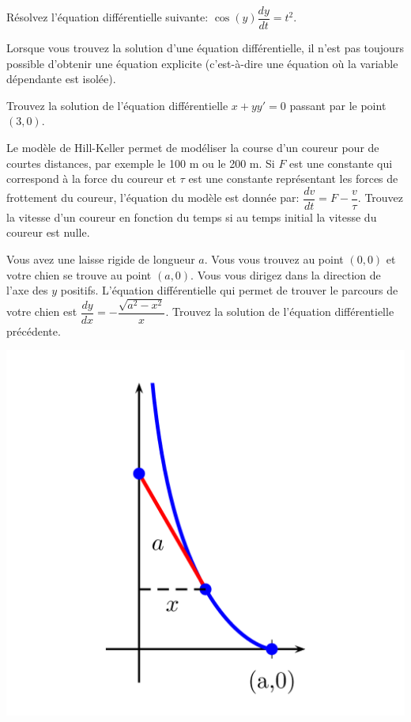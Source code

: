 \documentclass[]{book}
\theoremstyle{definition}
\theoremstyle{definition}
\theoremstyle{definition}
\theoremstyle{remark}
\let\BeginKnitrBlock\begin \let\EndKnitrBlock\end
\begin{document}
\BeginKnitrBlock{example}
\protect\hypertarget{exm:unnamed-chunk-52}{}{\label{exm:unnamed-chunk-52}
}Résolvez l'équation différentielle suivante:
\(\cos(y)\dfrac{dy}{dt}=t^2\).
\EndKnitrBlock{example}
\vspace*{8cm}

\BeginKnitrBlock{remark}
{}Lorsque vous trouvez la solution d'une
équation différentielle, il n'est pas toujours possible d'obtenir une
équation explicite (c'est-à-dire une équation où la variable dépendante
est isolée).
\EndKnitrBlock{remark}

\BeginKnitrBlock{example}
\protect\hypertarget{exm:unnamed-chunk-54}{}{\label{exm:unnamed-chunk-54}
}Trouvez la solution de l'équation différentielle \(x+yy'=0\) passant
par le point \((3,0)\).
\EndKnitrBlock{example}
\vspace*{8cm}

\BeginKnitrBlock{example}[Modèle de Hill-Keller]
\protect\hypertarget{exm:unnamed-chunk-55}{}{\label{exm:unnamed-chunk-55}
{} }Le modèle de Hill-Keller permet
de modéliser la course d'un coureur pour de courtes distances, par
exemple le 100 m ou le 200 m. Si \(F\) est une constante qui correspond
à la force du coureur et \(\tau\) est une constante représentant les
forces de frottement du coureur, l'équation du modèle est donnée par:
\(\dfrac{dv}{dt}=F-\dfrac{v}{\tau}\). Trouvez la vitesse d'un coureur en
fonction du temps si au temps initial la vitesse du coureur est nulle.
\EndKnitrBlock{example}
\vspace*{10cm}

\BeginKnitrBlock{example}[La tractrice]
\protect\hypertarget{exm:unnamed-chunk-56}{}{\label{exm:unnamed-chunk-56}
{} }Vous avez une laisse rigide de longueur
\(a\). Vous vous trouvez au point \((0,0)\) et votre chien se trouve au
point \((a,0)\). Vous vous dirigez dans la direction de l'axe des \(y\)
positifs. L'équation différentielle qui permet de trouver le parcours de
votre chien est \(\dfrac{dy}{dx}=-\dfrac{\sqrt{a^2-x^2}}{x}\). Trouvez
la solution de l'équation différentielle précédente.
\EndKnitrBlock{example}

\begin{center}\includegraphics[width=0.75\linewidth]{resources/images/latex/tractrice} \end{center}
\vspace*{10cm}
\end{document}
